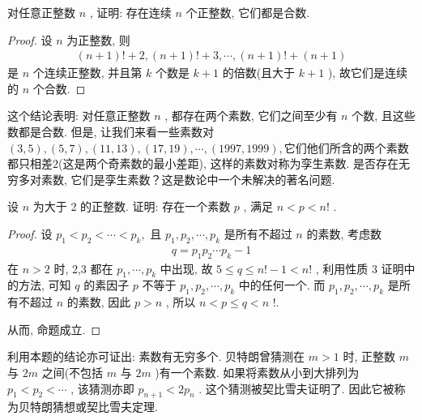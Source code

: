 \begin{example}
	对任意正整数 $n$ , 证明: 存在连续 $n$ 个正整数, 它们都是合数.
\end{example}
\begin{proof}
	设 $n$ 为正整数, 则
	\begin{align*}
		(n+1)!+2,(n+1)!+3, \cdots,(n+1)!+(n+1)
	\end{align*}
	是 $n$ 个连续正整数, 并且第 $k$ 个数是 $k+1$ 的倍数(且大于 $k+1$ ), 故它们是连续的 $n$ 个合数.
\end{proof}
\begin{note}
	这个结论表明: 对任意正整数 $n$ , 都存在两个素数, 它们之间至少有 $n$ 个数, 且这些数都是合数. 但是, 让我们来看一些素数对$(3, 5), (5, 7), (11,13),(17,19),\cdots,(1997,1999),$它们他们所含的两个素数都只相差$2$(这是两个奇素数的最小差距), 这样的素数对称为孪生素数. 是否存在无穷多对素数, 它们是孪生素数？这是数论中一个未解决的著名问题.
\end{note}

\begin{example}
	设 $n$ 为大于 2 的正整数. 证明: 存在一个素数 $p$ , 满足 $n<p<n!$ .
\end{example}
\begin{proof}
	设 $p_{1}<p_{2}<\cdots<p_{k} , $ 且 $p_{1}, p_{2}, \cdots, p_{k}$ 是所有不超过 $n$ 的素数, 考虑数
\begin{align*}
		q=p_{1} p_{2} \cdots p_{k}-1
	\end{align*}
	在 $n>2$ 时,  2,3 都在 $p_{1}, \cdots, p_{k}$ 中出现, 故 $5 \leqslant q \leqslant n!-1<n!$ , 利用性质 3 证明中的方法, 可知 $q$ 的素因子 $p$ 不等于 $p_{1}, p_{2}, \cdots, p_{k}$ 中的任何一个. 而 $p_{1}, p_{2}, \cdots, p_{k}$ 是所有不超过 $n$ 的素数, 因此 $p>n$ , 所以 $n<p \leqslant q<n$ !.

	从而, 命题成立.
\end{proof}
\begin{note}
	利用本题的结论亦可证出: 素数有无穷多个. 贝特朗曾猜测在 $m>1$ 时, 正整数 $m$ 与 $2 m$ 之间(不包括 $m$ 与 $2 m$ )有一个素数. 如果将素数从小到大排列为 $p_{1}<p_{2}<\cdots$ , 该猜测亦即 $p_{n+1}<2 p_{n}$ . 这个猜测被契比雪夫证明了. 因此它被称为贝特朗猜想或契比雪夫定理.
\end{note}

